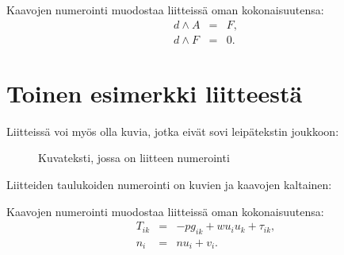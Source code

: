\documentclass[finnish, 12pt, a4paper, sci, utf8, pdfa]{aaltothesis}
\begin{document}
Kaavojen numerointi muodostaa liitteissä oman kokonaisuutensa:
\begin{eqnarray}
d \wedge A  &=& F, \label{liitekaava1}\\
d \wedge F  &=& 0. \label{liitekaava2}
\end{eqnarray}


\clearpage
\section{Toinen esimerkki liitteestä\label{LiiteB}}


Liitteissä voi myös olla kuvia, jotka
eivät sovi leipätekstin joukkoon:
\begin{figure}[htb]
\begin{center}
\end{center}
\caption{Kuvateksti, jossa on liitteen numerointi}
\label{liitekuva}
\end{figure}
Liitteiden taulukoiden numerointi on kuvien ja kaavojen kaltainen:
\begin{table}[htb]
\caption{Taulukon kuvateksti.}
\label{liitetaulukko}
\begin{center}
\end{center}
\end{table}
Kaavojen numerointi muodostaa liitteissä oman kokonaisuutensa:
\begin{eqnarray}
T_{ik} &=& -p g_{ik} + w u_i u_k + \tau_{ik},  \label{liitekaava3} \\
n_i    &=& n u_i + v_i.                      \label{liitekaava4}
\end{eqnarray}
\end{document}
